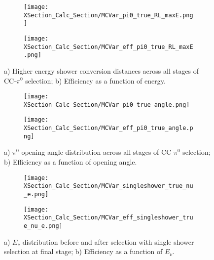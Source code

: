 \begin{figure}[h!]
  \begin{subfigure}[t]{0.39\textwidth}
\texttt{[image: XSection\_Calc\_Section/MCVar\_pi0\_true\_RL\_maxE.png]}
  \caption{ }
  \end{subfigure} 
  \hspace{15mm}
  \begin{subfigure}[t]{0.39\textwidth}
\texttt{[image: XSection\_Calc\_Section/MCVar\_eff\_pi0\_true\_RL\_maxE.png]}
  \caption{ }
  \end{subfigure} 
\caption{a) Higher energy shower conversion distances across all stages of CC-$\pi^0$ selection; b) Efficiency as a function of energy. }
\label{fig:pi0_effs_5}
\end{figure}


\begin{figure}[h!]
  \begin{subfigure}[t]{0.39\textwidth}
\texttt{[image: XSection\_Calc\_Section/MCVar\_pi0\_true\_angle.png]}
  \caption{ }
  \end{subfigure} 
  \hspace{15mm}
  \begin{subfigure}[t]{0.39\textwidth}
\texttt{[image: XSection\_Calc\_Section/MCVar\_eff\_pi0\_true\_angle.png]}
  \caption{ }
  \end{subfigure} 
\caption{a) $\pi^0$ opening angle distribution across all stages of CC $\pi^0$ selection; b) Efficiency as a function of opening angle. }
\label{fig:pi0_effs_6}
\end{figure}



\begin{figure}[h!]
  \begin{subfigure}[t]{0.39\textwidth}
\texttt{[image: XSection\_Calc\_Section/MCVar\_singleshower\_true\_nu\_e.png]}
  \caption{ }
  \end{subfigure} 
  \hspace{15mm}
  \begin{subfigure}[t]{0.39\textwidth}
\texttt{[image: XSection\_Calc\_Section/MCVar\_eff\_singleshower\_true\_nu\_e.png]}
  \caption{ }
  \end{subfigure} 
\caption{a) $E_\nu$ distribution before and after selection with single shower selection at final stage; b) Efficiency as a function of $E_\nu$. }
\label{fig:pi0_effs_7}
\end{figure}

